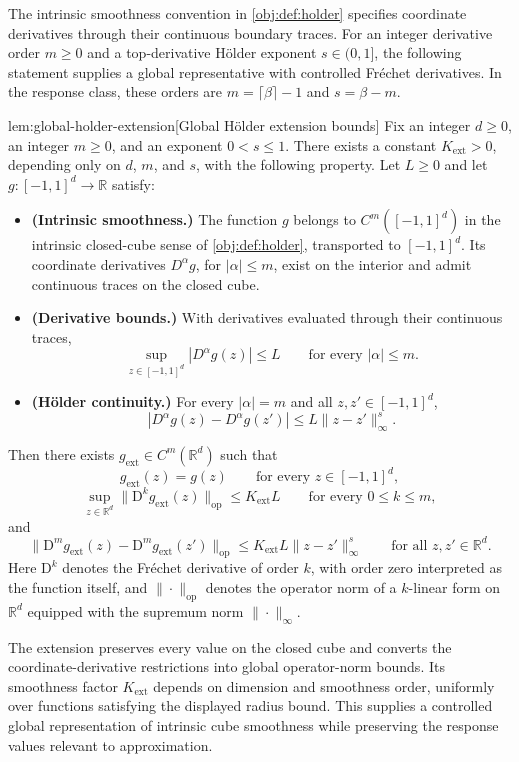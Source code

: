The intrinsic smoothness convention in \cref{obj:def:holder} specifies coordinate derivatives through their continuous boundary traces. For an integer derivative order \(m\ge0\) and a top-derivative Hölder exponent \(s\in(0,1]\), the following statement supplies a global representative with controlled Fréchet derivatives. In the response class, these orders are \(m=\lceil\beta\rceil-1\) and \(s=\beta-m\).

\begin{lemmav}{lem:global-holder-extension}[Global Hölder extension bounds]
Fix an integer \(d\ge0\), an integer \(m\ge0\), and an exponent \(0<s\le1\). There exists a constant \(K_{\mathrm{ext}}>0\), depending only on \(d\), \(m\), and \(s\), with the following property. Let \(L\ge0\) and let \(g:[-1,1]^d\to\mathbb R\) satisfy:
\begin{itemize}
\item \textbf{(Intrinsic smoothness.)} The function \(g\) belongs to \(C^m([-1,1]^d)\) in the intrinsic closed-cube sense of \cref{obj:def:holder}, transported to \([-1,1]^d\). Its coordinate derivatives \(D^\alpha g\), for \(|\alpha|\le m\), exist on the interior and admit continuous traces on the closed cube.
\item \textbf{(Derivative bounds.)} With derivatives evaluated through their continuous traces,
\[
\sup_{z\in[-1,1]^d}|D^\alpha g(z)|\le L
\qquad\text{for every }|\alpha|\le m.
\]
\item \textbf{(Hölder continuity.)} For every \(|\alpha|=m\) and all \(z,z'\in[-1,1]^d\),
\[
|D^\alpha g(z)-D^\alpha g(z')|
\le L\|z-z'\|_\infty^{s}.
\]
\end{itemize}
Then there exists \(g_{\mathrm{ext}}\in C^m(\mathbb R^d)\) such that
\[
g_{\mathrm{ext}}(z)=g(z)
\qquad\text{for every }z\in[-1,1]^d,
\]
\[
\sup_{z\in\mathbb R^d}
\|\mathrm D^{k}g_{\mathrm{ext}}(z)\|_{\mathrm{op}}
\le K_{\mathrm{ext}}L
\qquad\text{for every }0\le k\le m,
\]
and
\[
\|\mathrm D^{m}g_{\mathrm{ext}}(z)
-\mathrm D^{m}g_{\mathrm{ext}}(z')\|_{\mathrm{op}}
\le K_{\mathrm{ext}}L\|z-z'\|_\infty^{s}
\qquad\text{for all }z,z'\in\mathbb R^d.
\]
Here \(\mathrm D^{k}\) denotes the Fréchet derivative of order \(k\), with order zero interpreted as the function itself, and \(\|\cdot\|_{\mathrm{op}}\) denotes the operator norm of a \(k\)-linear form on \(\mathbb R^d\) equipped with the supremum norm \(\|\cdot\|_\infty\).
\end{lemmav}

The extension preserves every value on the closed cube and converts the coordinate-derivative restrictions into global operator-norm bounds. Its smoothness factor \(K_{\mathrm{ext}}\) depends on dimension and smoothness order, uniformly over functions satisfying the displayed radius bound. This supplies a controlled global representation of intrinsic cube smoothness while preserving the response values relevant to approximation.


